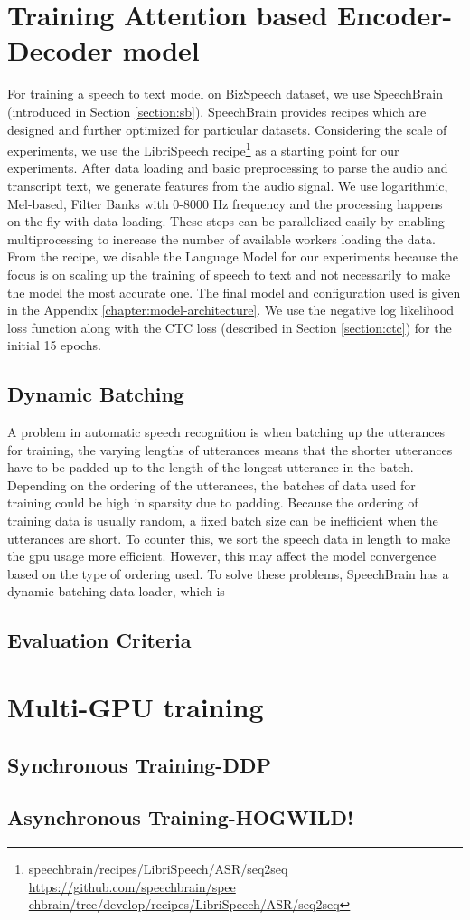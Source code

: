 \section{Training Attention based Encoder-Decoder model}
For training a speech to text model on BizSpeech dataset, we use SpeechBrain (introduced in Section \ref{section:sb}). SpeechBrain provides recipes which are designed and further optimized for particular datasets. Considering the scale of experiments, we use the LibriSpeech recipe\footnote{speechbrain/recipes/LibriSpeech/ASR/seq2seq \href{https://github.com/speechbrain/speechbrain/tree/develop/recipes/LibriSpeech/ASR/seq2seq}{https://github.com/speechbrain/spee chbrain/tree/develop/recipes/LibriSpeech/ASR/seq2seq}} as a starting point for our experiments. After data loading and basic preprocessing to parse the audio and transcript text, we generate features from the audio signal. We use logarithmic, Mel-based, Filter Banks with  0-8000 Hz frequency and the processing happens on-the-fly with data loading. These steps can be parallelized easily by enabling multiprocessing to increase the number of available workers loading the data. From the recipe, we disable the Language Model for our experiments because the focus is on scaling up the training of speech to text and not necessarily to make the model the most accurate one. The final model and configuration used is given in the Appendix \ref{chapter:model-architecture}. We use the negative log likelihood loss function along with the CTC loss (described in Section \ref{section:ctc}) for the initial 15 epochs. 

\subsection{Dynamic Batching}
A problem in automatic speech recognition is when batching up the utterances for training, the varying lengths of utterances means that the shorter utterances have to be padded up to the length of the longest utterance in the batch. Depending on the ordering of the utterances, the batches of data used for training could be high in sparsity due to padding. Because the ordering of training data is usually random, a fixed batch size can be inefficient when the utterances are short. To counter this, we sort the speech data in length to make the \acrshort{gpu} usage more efficient. However, this may affect the model convergence based on the type of ordering used. To solve these problems, SpeechBrain has a dynamic batching data loader, which is 
\subsection{Evaluation Criteria}

\section{Multi-GPU training}
\subsection{Synchronous Training-DDP}
\subsection{Asynchronous Training-HOGWILD!}